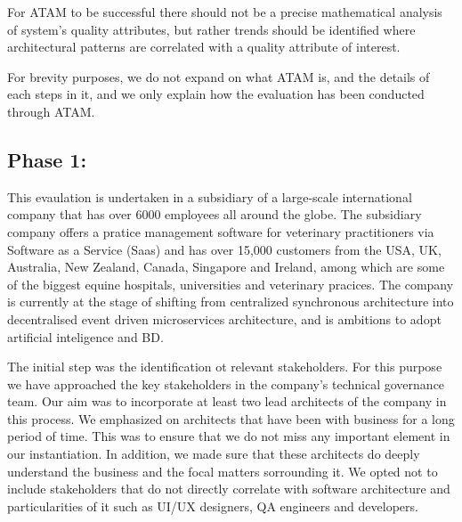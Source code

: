 \documentclass[review]{elsarticle}
\begin{document}
For ATAM to be successful there should not be a precise mathematical analysis of system's quality attributes, but rather trends should be identified where architectural patterns are correlated with a quality attribute of interest.

For brevity purposes, we do not expand on what ATAM is, and the details of each steps in it, and we only explain how the evaluation has been conducted through ATAM.




\subsection{Phase 1:}

This evaulation is undertaken in a subsidiary of a large-scale international company that has over 6000 employees all around the globe. The subsidiary company offers a pratice management software for veterinary practitioners via Software as a Service (Saas) and has over 15,000 customers from the USA, UK, Australia, New Zealand, Canada, Singapore and Ireland, among which are some of the biggest equine hospitals, universities and veterinary pracices. The company is currently at the stage of shifting from centralized synchronous architecture into decentralised event driven microservices architecture, and is ambitions to adopt artificial inteligence and BD.

The initial step was the identification ot relevant stakeholders. For this purpose we have approached the key stakeholders in the company's technical governance team. Our aim was to incorporate at least two lead architects of the company in this process. We emphasized on architects that have been with business for a long period of time. This was to ensure that we do not miss any important element in our instantiation. In addition, we made sure that these architects do deeply understand the business and the focal matters sorrounding it. We opted not to include stakeholders that do not directly correlate with software architecture and particularities of it such as UI/UX designers, QA engineers and developers.
\end{document}
